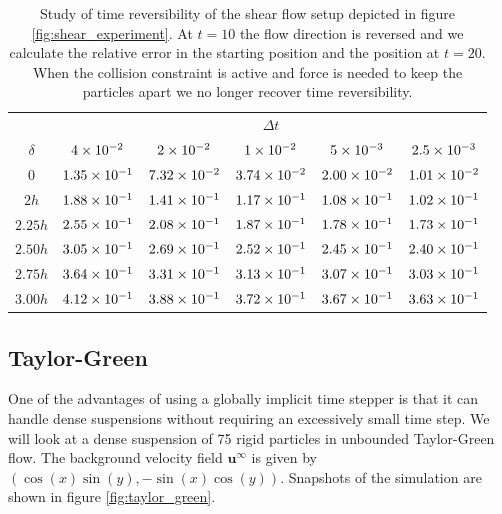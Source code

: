\documentclass[preprint, 10pt]{elsarticle}
\begin{document}
\begin{table}[!h]
\begin{center}
\begin{tabular}{c| c c c c c}
$ $ & & & $\Delta t$ & &\\
$\delta$ & $4\times 10^{-2}$ &$ 2\times 10^{-2}$ & $1\times 10^{-2}$ & $5\times 10^{-3}$ & $2.5\times 10^{-3}$\\
\hline
0 & $1.35\times 10^{-1}$ & $7.32\times 10^{-2}$ & $3.74\times 10^{-2}$ & $2.00\times 10^{-2}$ & $1.01\times 10^{-2}$\\
$2h$ & $1.88\times 10^{-1}$ & $1.41\times 10^{-1}$ & $1.17\times 10^{-1}$ & $1.08\times 10^{-1}$ & $1.02\times 10^{-1}$\\
$2.25h$ & $2.55\times 10^{-1}$ & $2.08\times 10^{-1}$ & $1.87\times 10^{-1}$ & $1.78\times 10^{-1}$ & $1.73\times 10^{-1}$\\
$2.50h$ & $3.05\times 10^{-1}$ & $2.69\times 10^{-1}$ & $2.52\times 10^{-1}$ & $2.45\times 10^{-1}$ & $2.40\times 10^{-1}$\\
$2.75h$ & $3.64\times 10^{-1}$ & $3.31\times 10^{-1}$ & $3.13\times 10^{-1}$ & $3.07\times 10^{-1}$ & $3.03\times 10^{-1}$\\
$3.00h$ & $4.12\times 10^{-1}$ & $3.88\times 10^{-1}$ & $3.72\times 10^{-1}$ & $3.67\times 10^{-1}$ & $3.63\times 10^{-1}$
\end{tabular}
\end{center}
\caption{Study of time reversibility of the shear flow setup depicted in figure \ref{fig:shear_experiment}. At $t=10$ the flow direction is reversed and we calculate the relative error in the starting position and the position at $t=20$. When the collision constraint is active and force is needed to keep the particles apart we no longer recover time reversibility.}\label{tab:reverse}
\end{table}


\subsection{Taylor-Green}

One of the advantages of using a globally implicit time stepper is that it can handle dense suspensions without requiring an excessively small time step. We will look at a dense suspension of 75 rigid particles in unbounded Taylor-Green flow. The background velocity field $\mathbf{u}^\infty$ is given by $(\cos(x)\sin(y), -\sin(x)\cos(y))$. Snapshots of the simulation are shown in figure \ref{fig:taylor_green}. 
\end{document}
